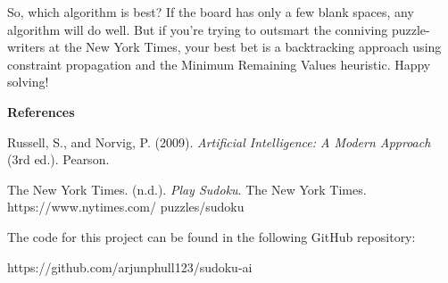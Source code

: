 \documentclass[12pt]{article}
\begin{document}
	So, which algorithm is best? If the board has only a few blank spaces, any algorithm will do well. But if you're trying to outsmart the conniving puzzle-writers at the New York Times, your best bet is a backtracking approach using constraint propagation and the Minimum Remaining Values heuristic. Happy solving!
	
\newpage
\begin{center}
	\textbf{References}
\end{center}
\begin{list}{}{ 
    \setlength{\itemindent}{-0.5in}
    \setlength{\leftmargin}{0.5in}
    }
\item Russell, S., and Norvig, P. (2009). \textit{Artificial Intelligence: A Modern Approach} (3rd ed.). Pearson.
\item The New York Times. (n.d.). \textit{Play Sudoku}. The New York Times. https://www.nytimes.com/ puzzles/sudoku
\end{list}
The code for this project can be found in the following GitHub repository:
\begin{center}
	https://github.com/arjunphull123/sudoku-ai
\end{center}
\end{document}
